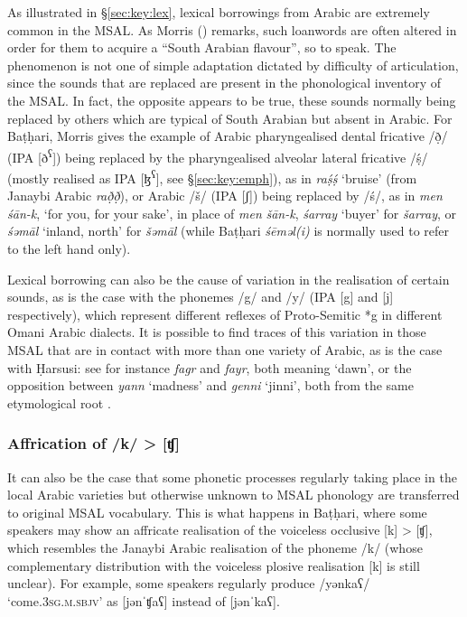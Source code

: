 \documentclass[output=paper]{langsci/langscibook}
\begin{document}
As illustrated in §\ref{sec:key:lex}, lexical borrowings from Arabic are extremely common in the MSAL. As Morris (\citeyear[13]{Morris2017}) remarks, such loanwords are often altered in order for them to acquire a “South Arabian flavour”, so to speak. The phenomenon is not one of simple adaptation dictated by difficulty of articulation, since the sounds that are replaced are present in the phonological inventory of the MSAL. In fact, the opposite appears to be true, these sounds normally being replaced by others which are typical of South Arabian but absent in Arabic. For Baṭḥari, Morris gives the example of Arabic pharyngealised dental fricative /\d{ð}/ (IPA [ð\textsuperscript{ʕ}]) being replaced by the pharyngealised alveolar lateral fricative /ṣ́/ (mostly realised as IPA [ɮ\textsuperscript{ʕ}], see §\ref{sec:key:emph}), as in \textit{raṣ́ṣ́} ‘bruise’ (from Janaybi Arabic \textit{rað̣ð̣}), or Arabic /š/ (IPA [ʃ]) being replaced by /ś/, as in \textit{men} \textit{śān-k}, ‘for you, for your sake’, in place of \textit{men} \textit{šān-k}, \textit{śarray} ‘buyer’ for \textit{šarray}, or \textit{śəmāl} ‘inland, north’ for \textit{šəmāl} (while Baṭḥari \textit{śēməl(i)} is normally used to refer to the left hand only). 

Lexical borrowing can also be the cause of variation in the realisation of certain sounds, as is the case with the phonemes /g/ and /y/ (IPA [g] and [j] respectively), which represent different reflexes of Proto-Semitic *g in different Omani Arabic dialects. It is possible to find traces of this variation in those MSAL that are in contact with more than one variety of Arabic, as is the case with Ḥarsusi: see for instance \textit{fagr} and \textit{fayr}, both meaning ‘dawn’, or the opposition between \textit{yann} ‘madness’ and \textit{genni} ‘jinni’, both from the same etymological root \citep[299]{Lonnet2011}.


 \subsubsection{Affrication of /k/ > [ʧ]}

It can also be the case that some phonetic processes regularly taking place in the local Arabic varieties but otherwise unknown to MSAL phonology are transferred to original MSAL vocabulary. This is what happens in Baṭḥari, where some speakers may show an affricate realisation of the voiceless occlusive [k] > [ʧ], which resembles the Janaybi Arabic realisation of the phoneme /k/ (whose complementary distribution with the voiceless plosive realisation [k] is still unclear). For example, some speakers regularly produce /yənkaʕ/ ‘come.\textsc{3sg.m.sbjv}’ as [jənˈʧaʕ] instead of [jənˈkaʕ]. 
\end{document}
